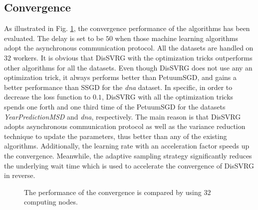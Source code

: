 \documentclass[preprint,review,11pt,a4paper]{elsarticle}
\begin{document}
\subsection{Convergence}
As illustrated in Fig. \ref{figure_evaluation1_convergence}, the  convergence performance of the algorithms has been evaluated. The delay is set to be $50$ when those machine learning algorithms adopt the asynchronous communication protocol. All the datasets are handled on $32$ workers.  It is obvious that DisSVRG with the optimization tricks outperforms other algorithms for all the datasets. Even though DisSVRG does not use any an optimization trick, it always performs better than PetuumSGD, and gains a better performance than SSGD for the \emph{dna} dataset. In specific, in order to decrease the loss function to $0.1$, DisSVRG with all the optimization tricks spends one forth and one third time of the PetuumSGD for the datasets \emph{YearPredictionMSD} and \emph{dna}, respectively.  The main reason is that DisSVRG adopts asynchronous communication protocol as well as the variance reduction technique to update the parameters, thus better than any of the existing algorithms. Additionally, the  learning rate with an acceleration factor speeds up the convergence. Meanwhile, the adaptive sampling strategy significantly reduces the underlying wait time which is used to accelerate the convergence of DisSVRG in reverse.

\begin{figure}
\centering
{}
\caption{The performance of the convergence is compared by using $32$ computing nodes.}
\label{figure_evaluation1_convergence}
\end{figure}
\end{document}
